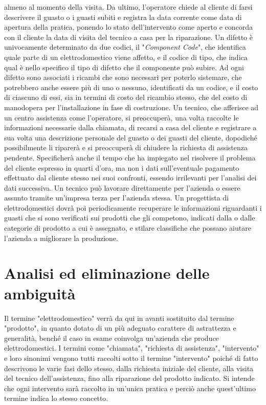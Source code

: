 \documentclass[a4paper, 12pt]{report}
\begin{document}
almeno al momento della visita. Da ultimo, l'operatore chiede al cliente di farsi descrivere il guasto o i guasti subiti e registra la data corrente come data di apertura 
della pratica, ponendo lo stato dell'intervento come aperto e concorda con il cliente la data di visita del tecnico a casa per la riparazione.\newline
Un difetto è univocamente determinato da due codici, il "\textit{Component Code}", che identifica quale parte di un elettrodomestico viene affetto, e
il codice di tipo, che indica qual è nello specifico il tipo di difetto che il componente può subire. Ad ogni difetto sono associati i ricambi che sono 
necessari per poterlo sistemare, che potrebbero anche essere più di uno o nessuno, identificati da un codice, e il costo di ciascuno di essi, 
sia in termini di costo del ricambio stesso, che del costo di manodopera per l'installazione in fase di costruzione.\newline
Un tecnico, che afferisce ad un centro assistenza come l'operatore, si preoccuperà, una volta raccolte le informazioni necessarie dalla chiamata,
di recarsi a casa del cliente e registrare a sua volta una descrizione personale del guasto o dei guasti del cliente, dopodiché possibilmente li riparerà
e si preoccuperà di chiudere la richiesta di assistenza pendente. Specificherà anche il tempo che ha impiegato nel risolvere il problema del cliente
espresso in quarti d'ora, ma non i dati sull'eventuale pagamento effettuato dal cliente stesso nei suoi confronti, essendo irrilevanti per l'analisi dei dati successiva.
Un tecnico può lavorare direttamente per l'azienda o essere assunto tramite un'impresa terza per l'azienda stessa. \newline
Un progettista di elettrodomestici dovrà poi periodicamente recuperare le informazioni riguardanti i guasti che si sono verificati sui prodotti che
gli competono, indicati dalla o dalle categorie di prodotto a cui è assegnato, e stilare classifiche che possano aiutare l'azienda a migliorare la produzione.

\section{Analisi ed eliminazione delle ambiguità}

Il termine "elettrodomestico" verrà da qui in avanti sostituito dal termine "prodotto", in quanto dotato di un più adeguato carattere di astrattezza
e generalità, benché il caso in esame coinvolga un'azienda che produce elettrodomestici. I termini come "chiamata", "richiesta di
assistenza", "intervento" e loro sinonimi vengono tutti raccolti sotto il termine "intervento" poiché di fatto descrivono le varie fasi dello
stesso, dalla richiesta iniziale del cliente, alla visita del tecnico dell'assistenza, fino alla riparazione del prodotto indicato. Si intende
che ogni intervento sarà raccolto in un'unica pratica e perciò anche quest'ultimo termine indica lo stesso concetto.
\end{document}
